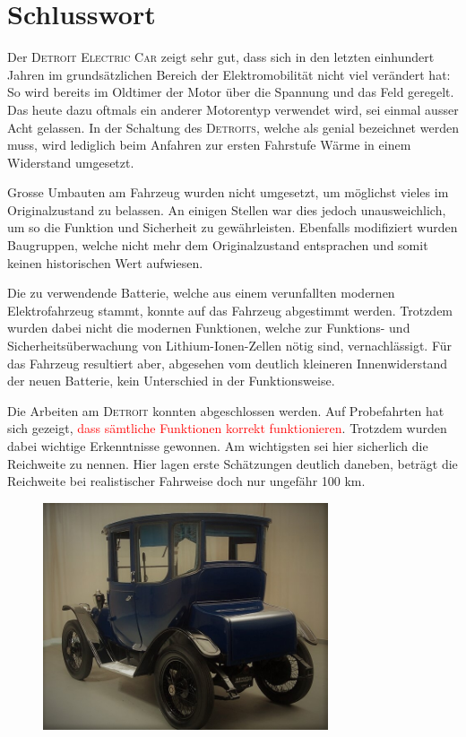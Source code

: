 \chapter{Schlusswort}
\color{blue}
Der \textsc{Detroit Electric Car} zeigt sehr gut, dass sich in den letzten einhundert Jahren im grundsätzlichen Bereich der Elektromobilität nicht viel verändert hat: So wird bereits im Oldtimer der Motor über die Spannung und das Feld geregelt. Das heute dazu oftmals ein anderer Motorentyp verwendet wird, sei einmal ausser Acht gelassen. In der Schaltung des \textsc{Detroits}, welche als genial bezeichnet werden muss, wird lediglich beim Anfahren zur ersten Fahrstufe Wärme in einem Widerstand umgesetzt.

Grosse Umbauten am Fahrzeug wurden nicht umgesetzt, um möglichst vieles im Originalzustand zu belassen. An einigen Stellen war dies jedoch unausweichlich, um so die Funktion und Sicherheit zu gewährleisten. Ebenfalls modifiziert wurden Baugruppen, welche nicht mehr dem Originalzustand entsprachen und somit keinen historischen Wert aufwiesen.

Die zu verwendende Batterie, welche aus einem verunfallten modernen Elektrofahrzeug stammt, konnte auf das Fahrzeug abgestimmt werden. Trotzdem wurden dabei nicht die modernen Funktionen, welche zur Funktions- und Sicherheitsüberwachung von Lithium-Ionen-Zellen nötig sind, vernachlässigt. Für das Fahrzeug resultiert aber, abgesehen vom deutlich kleineren Innenwiderstand der neuen Batterie, kein Unterschied in der Funktionsweise.

Die Arbeiten am \textsc{Detroit} konnten abgeschlossen werden. Auf Probefahrten hat sich gezeigt, \textcolor{red}{dass sämtliche Funktionen korrekt funktionieren}. Trotzdem wurden dabei wichtige Erkenntnisse gewonnen. Am wichtigsten sei hier sicherlich die Reichweite zu nennen. Hier lagen erste Schätzungen deutlich daneben, beträgt die Reichweite bei realistischer Fahrweise doch nur ungefähr 100 km.

\begin{figure}[h]
	\centering
		\includegraphics[width=0.75\textwidth]{images/Ende.jpg}
	\label{fig:Ende}
\end{figure}


\color{black}